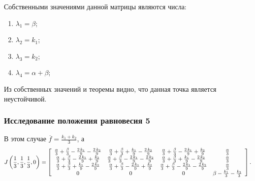 \documentclass[12pt]{article}
\theoremstyle{rusdef}
\begin{document}
		
		Собственными значениями данной матрицы являются числа:
		\begin{enumerate}
			\item
			$\lambda_1 = \beta$;
			\item
			$\lambda_2 = k_1$;
			\item
			$\lambda_3 = k_2$;
			\item
			$\lambda_4 = \alpha+\beta$;
		\end{enumerate}
		
		Из собственных значений и теоремы видно, что данная точка является неустойчивой.
	
	\subsubsection{Исследование положения равновесия 5}
	
	В этом случае $\overline{f} = \tfrac{k_1 + k_2}{3}$, а
	\begin{gather}
	J\left(\frac{1}{3}, \frac{1}{3}, \frac{1}{3}, 0\right) = \left[
\begin{array}{cccc} \frac{\alpha}{3} + \frac{\beta}{3} - \frac{2\, k_{1}}{9} - \frac{2\, k_{2}}{9} & \frac{\alpha}{3} + \frac{\beta}{3} + \frac{k_{1}}{9} - \frac{2\, k_{2}}{9} & \frac{\alpha}{3} + \frac{\beta}{3} - \frac{2\, k_{1}}{9} + \frac{k_{2}}{9} & \frac{\alpha}{3}\\ \frac{\alpha}{3} + \frac{\beta}{3} - \frac{2\, k_{1}}{9} + \frac{k_{2}}{9} & \frac{\alpha}{3} + \frac{\beta}{3} - \frac{2\, k_{1}}{9} - \frac{2\, k_{2}}{9} & \frac{\alpha}{3} + \frac{\beta}{3} + \frac{k_{1}}{9} - \frac{2\, k_{2}}{9} & \frac{\alpha}{3}\\ \frac{\alpha}{3} + \frac{\beta}{3} + \frac{k_{1}}{9} - \frac{2\, k_{2}}{9} & \frac{\alpha}{3} + \frac{\beta}{3} - \frac{2\, k_{1}}{9} + \frac{k_{2}}{9} & \frac{\alpha}{3} + \frac{\beta}{3} - \frac{2\, k_{1}}{9} - \frac{2\, k_{2}}{9} & \frac{\alpha}{3}\\ 0 & 0 & 0 & \beta - \frac{k_{1}}{3} - \frac{k_{2}}{3} \end{array}
	\right]. \notag
	\end{gather}
	
\end{document}
